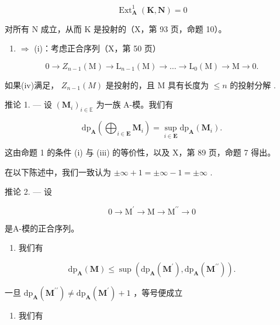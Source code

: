 \[
\operatorname{Ext} _ {\mathbf {A}} ^ {1} (\mathbf {K}, \mathbf {N}) = 0
\]

对所有 N 成立，从而 K 是投射的（X，第 93 页，命题 10）。

\begin{enumerate}
\def\labelenumi{(\roman{enumi})}
\setcounter{enumi}{3}
\tightlist
\item
  \(\Rightarrow\) (i)：考虑正合序列（X，第 50 页）
\end{enumerate}

\[
0 \to Z _ {n - 1} (\mathrm{M}) \to \mathrm{L} _ {n - 1} (\mathrm{M}) \to \dots \to \mathrm{L} _ {0} (\mathrm{M}) \to \mathrm{M} \to 0.
\]

如果(iv)满足， \(Z_{n-1}(M)\) 是投射的，且 M 具有长度为 \(\leqslant n\) 的投射分解 .

推论 1. --- 设 \((\mathbf{M}_i)_{i\in \mathbb{E}}\) 为一族 A-模。我们有

\[
\mathrm{dp} _ {\mathbf {A}} \left(\bigoplus_ {i \in \mathbf {E}} \mathbf {M} _ {i}\right) = \sup _ {i \in \mathbf {E}} \mathrm{dp} _ {\mathbf {A}} (\mathbf {M} _ {i}).
\]

这由命题 1 的条件 (i) 与 (iii) 的等价性，以及 X，第 89 页，命题 7 得出。

在以下陈述中，我们一致认为 \(\pm\infty + 1 = \pm\infty - 1 = \pm\infty\) .

推论 2. --- 设

\[
0 \rightarrow \mathrm{M} ^ {\prime} \rightarrow \mathrm{M} \rightarrow \mathrm{M} ^ {\prime \prime} \rightarrow 0
\]

是A-模的正合序列。

\begin{enumerate}
\def\labelenumi{\alph{enumi})}
\tightlist
\item
  我们有
\end{enumerate}

\[
\mathrm{dp} _ {\mathbf {A}} (\mathbf {M}) \leqslant \sup \left(\mathrm{dp} _ {\mathbf {A}} (\mathbf {M} ^ {\prime}), \mathrm{dp} _ {\mathbf {A}} (\mathbf {M} ^ {\prime \prime})\right).
\]

一旦 \(\mathrm{dp}_{\mathbf{A}}(\mathbf{M}^{\prime \prime})\neq \mathrm{dp}_{\mathbf{A}}(\mathbf{M}^{\prime}) + 1\) ，等号便成立

\begin{enumerate}
\def\labelenumi{\alph{enumi})}
\setcounter{enumi}{1}
\tightlist
\item
  我们有
\end{enumerate}

